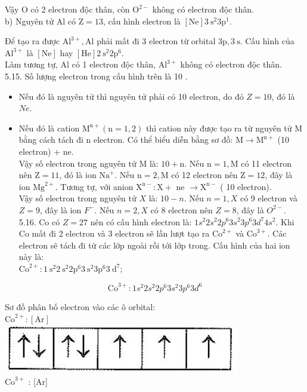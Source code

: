\documentclass[10pt]{article}
\begin{document}
Vậy O có 2 electron độc thân, còn $\mathrm{O}^{2-}$ không có electron độc thân.\\
b) Nguyên tử Al có $\mathrm{Z}=13$, cấu hình electron là $[\mathrm{Ne}] 3 \mathrm{~s}^{2} 3 \mathrm{p}^{1}$.

Để tạo ra được $\mathrm{Al}^{3+}, \mathrm{Al}$ phải mất đi 3 electron từ orbital $3 \mathrm{p}, 3 \mathrm{~s}$. Cấu hình của $\mathrm{Al}^{3+}$ là $[\mathrm{Ne}]$ hay $[\mathrm{He}] 2 \mathrm{~s}^{2} 2 \mathrm{p}^{6}$.\\
Làm tương tự, Al có 1 electron độc thân, $\mathrm{Al}^{3+}$ không có electron độc thân.\\
5.15. Số lượng electron trong cấu hình trên là 10 .

\begin{itemize}
  \item Nếu đó là nguyên tử thì nguyên tử phải có 10 electron, do đó $Z=10$, đó là $N e$.
  \item Nếu đó là cation $\mathrm{M}^{\mathrm{n}+}(\mathrm{n}=1,2)$ thì cation này được tạo ra từ nguyên tử M bằng cách tách đi n electron. Có thể biểu diễn bằng sơ đồ: $\mathrm{M} \rightarrow \mathrm{M}^{\mathrm{n}+}$ (10 electron) + ne.\\
Vậy số electron trong nguyên tử M là: $10+\mathrm{n}$. Nếu $\mathrm{n}=1, \mathrm{M}$ có 11 electron nên $\mathrm{Z}=11$, đó là ion $\mathrm{Na}^{+}$. Nếu $\mathrm{n}=2, \mathrm{M}$ có 12 electron nên $\mathrm{Z}=12$, đây là ion $\mathrm{Mg}^{2+}$. Tương tự, với anion $\mathrm{X}^{\mathrm{n}-}: \mathrm{X}+$ ne $\rightarrow \mathrm{X}^{\mathrm{n}-}$ ( 10 electron).\\
Vậy số electron trong nguyên tử $X$ là: $10-n$. Nếu $n=1, X$ có 9 electron và $Z=9$, đây là ion $F^{-}$. Nếu $n=2, X$ có 8 electron nên $Z=8$, đây là $O^{2-}$.\\
5.16. Co có $Z=27$ nên có cấu hình electron là: $1 s^{2} 2 s^{2} 2 p^{6} 3 s^{2} 3 p^{6} 3 d^{7} 4 s^{2}$. Khi Co mất đi 2 electron và 3 electron sẽ lần lượt tạo ra $\mathrm{Co}^{2+}$ và $\mathrm{Co}^{3+}$. Các electron sẽ tách đi từ các lớp ngoài rồi tới lớp trong. Cấu hình của hai ion này là:\\
$\mathrm{Co}^{2+}: 1 \mathrm{~s}^{2} 2 \mathrm{~s}^{2} 2 \mathrm{p}^{6} 3 \mathrm{~s}^{2} 3 \mathrm{p}^{6} 3 \mathrm{~d}^{7}$;
\end{itemize}

$$
\mathrm{Co}^{3+}: 1 s^{2} 2 s^{2} 2 p^{6} 3 s^{2} 3 p^{6} 3 d^{6}
$$

Sơ đồ phân bố electron vào các ô orbital:\\
$\mathrm{Co}^{2+}:[\mathrm{Ar}]$\\
\includegraphics[max width=\textwidth, center]{2025_10_23_baf6b6057fd5ebd09626g-06}\\
$\mathrm{Co}^{3+}$ : [Ar]
\end{document}
